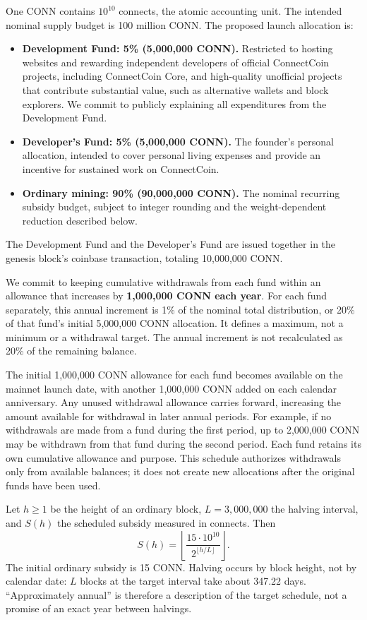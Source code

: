 \documentclass[11pt,a4paper]{article}
\begin{document}
One CONN contains $10^{10}$ connects, the atomic accounting unit. The intended
nominal supply budget is 100 million CONN. The proposed launch allocation is:
\begin{itemize}
 \item \textbf{Development Fund: 5\% (5,000,000 CONN).} Restricted to hosting
 websites and rewarding independent developers of official ConnectCoin
 projects, including ConnectCoin Core, and high-quality unofficial projects
 that contribute substantial value, such as alternative wallets and block
 explorers. We commit to publicly explaining all expenditures
 from the Development Fund.
 \item \textbf{Developer's Fund: 5\% (5,000,000 CONN).} The founder's personal
 allocation, intended to cover personal living expenses and provide an
 incentive for sustained work on ConnectCoin.
 \item \textbf{Ordinary mining: 90\% (90,000,000 CONN).} The nominal recurring
 subsidy budget, subject to integer rounding and the weight-dependent
 reduction described below.
\end{itemize}
The Development Fund and the Developer's Fund are issued together in the
genesis block's coinbase transaction, totaling 10,000,000 CONN.

We commit to keeping cumulative withdrawals from each fund within an
allowance that increases by \textbf{1,000,000 CONN each year}. For each fund
separately, this annual increment is 1\% of the nominal total distribution,
or 20\% of that fund's initial 5,000,000 CONN allocation. It defines a maximum,
not a minimum or a withdrawal target. The annual increment is not recalculated
as 20\% of the remaining balance.

The initial 1,000,000 CONN allowance for each fund becomes available on the
mainnet launch date, with another 1,000,000 CONN added on each calendar anniversary.
Any unused withdrawal allowance carries forward, increasing the amount
available for withdrawal in later annual periods. For example, if no withdrawals
are made from a fund during the first period, up to 2,000,000 CONN may be withdrawn
from that fund during the second period. Each fund retains its own cumulative
allowance and purpose. This schedule authorizes withdrawals only from available
balances; it does not create new allocations after the original funds have
been used.

Let $h\geq1$ be the height of an ordinary block, $L=3{,}000{,}000$ the halving
interval, and $S(h)$ the scheduled subsidy measured in connects. Then
\begin{equation}
 S(h)=\left\lfloor
    \frac{15\cdot10^{10}}{2^{\lfloor h/L\rfloor}}
 \right\rfloor.
 \label{eq:subsidy}
\end{equation}
The initial ordinary subsidy is 15 CONN. Halving occurs by block height, not by
calendar date: $L$ blocks at the target interval take about 347.22 days.
``Approximately annual'' is therefore a description of the target schedule,
not a promise of an exact year between halvings.
\end{document}
